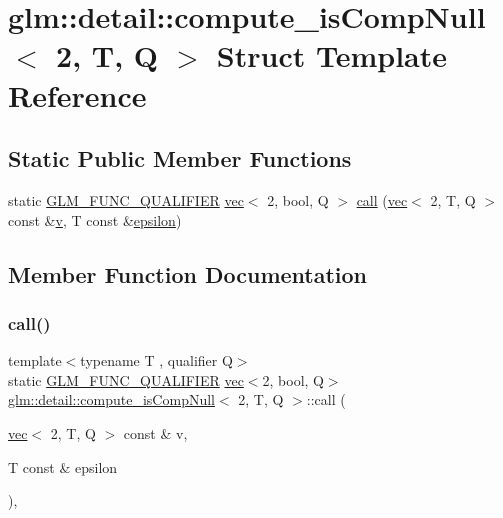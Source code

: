 \hypertarget{structglm_1_1detail_1_1compute__is_comp_null_3_012_00_01_t_00_01_q_01_4}{}\section{glm\+:\+:detail\+:\+:compute\+\_\+is\+Comp\+Null$<$ 2, T, Q $>$ Struct Template Reference}
\label{structglm_1_1detail_1_1compute__is_comp_null_3_012_00_01_t_00_01_q_01_4}
\subsection*{Static Public Member Functions}
\begin{DoxyCompactItemize}
\item 
static \mbox{\hyperlink{setup_8hpp_a33fdea6f91c5f834105f7415e2a64407}{G\+L\+M\+\_\+\+F\+U\+N\+C\+\_\+\+Q\+U\+A\+L\+I\+F\+I\+ER}} \mbox{\hyperlink{structglm_1_1vec}{vec}}$<$ 2, bool, Q $>$ \mbox{\hyperlink{structglm_1_1detail_1_1compute__is_comp_null_3_012_00_01_t_00_01_q_01_4_acec5e6ad7a0200dcbc038f9efcd97a36}{call}} (\mbox{\hyperlink{structglm_1_1vec}{vec}}$<$ 2, T, Q $>$ const \&\mbox{\hyperlink{_s_d_l__opengl_8h_a10a82eabcb59d2fcd74acee063775f90}{v}}, T const \&\mbox{\hyperlink{group__gtc__constants_ga2a1e57fc5592b69cfae84174cbfc9429}{epsilon}})
\end{DoxyCompactItemize}


\subsection{Member Function Documentation}
\mbox{\label{structglm_1_1detail_1_1compute__is_comp_null_3_012_00_01_t_00_01_q_01_4_acec5e6ad7a0200dcbc038f9efcd97a36}} 
\subsubsection{\texorpdfstring{call()}{call()}}
{\footnotesize\ttfamily template$<$typename T , qualifier Q$>$ \\
static \mbox{\hyperlink{setup_8hpp_a33fdea6f91c5f834105f7415e2a64407}{G\+L\+M\+\_\+\+F\+U\+N\+C\+\_\+\+Q\+U\+A\+L\+I\+F\+I\+ER}} \mbox{\hyperlink{structglm_1_1vec}{vec}}$<$2, bool, Q$>$ \mbox{\hyperlink{structglm_1_1detail_1_1compute__is_comp_null}{glm\+::detail\+::compute\+\_\+is\+Comp\+Null}}$<$ 2, T, Q $>$\+::call (\begin{DoxyParamCaption}\item[{\mbox{\hyperlink{structglm_1_1vec}{vec}}$<$ 2, T, Q $>$ const \&}]{v,  }\item[{T const \&}]{epsilon }\end{DoxyParamCaption})\hspace{0.3cm}{\ttfamily [inline]}, {\ttfamily [static]}}



